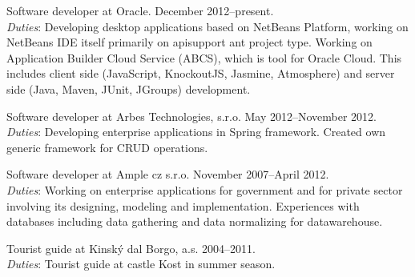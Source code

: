 \documentclass[czech]{article}
\renewenvironment{itemize}{
  \begin{list}{}{
    \setlength{\leftmargin}{1.5em}
  }
}{
  \end{list}
}
\begin{document}
\begin{itemize}
\item Software developer at Oracle. December 2012--present.\\
\textit{Duties}: Developing desktop applications based on NetBeans Platform, working on NetBeans IDE itself primarily on apisupport ant project type. Working on Application Builder Cloud Service (ABCS), which is tool for Oracle Cloud. This includes client side (JavaScript, KnockoutJS, Jasmine, Atmosphere) and server side (Java, Maven, JUnit, JGroups) development.
\item Software developer at Arbes Technologies, s.r.o. May 2012--November 2012.\\
\textit{Duties}: Developing enterprise applications in Spring framework. Created own generic framework for CRUD operations.
\item Software developer at Ample cz s.r.o. November 2007--April 2012.\\
\textit{Duties}: Working on enterprise applications for government and for
private sector involving its designing, modeling and implementation. Experiences
with databases including data gathering and data normalizing for datawarehouse.
\item Tourist guide at Kinský dal Borgo, a.s. 2004--2011.\\
\textit{Duties}: Tourist guide at castle Kost in summer season.
\end{itemize}
\end{document}
